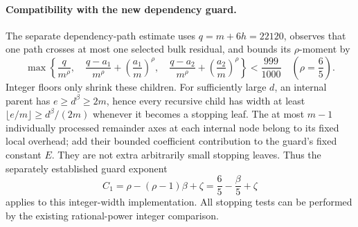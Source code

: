 \paragraph{Compatibility with the new dependency guard.}
The separate dependency-path estimate uses $q=m+6h=22120$, observes that
one path crosses at most one selected bulk residual, and bounds its
$\rho$-moment by
\[
 \max\left\{
 \frac q{m^\rho},\quad
 \frac{q-a_1}{m^\rho}+\left(\frac{a_1}{m}\right)^\rho,\quad
 \frac{q-a_2}{m^\rho}+\left(\frac{a_2}{m}\right)^\rho
 \right\}<\frac{999}{1000}
 \quad\left(\rho=\frac65\right).
\]
Integer floors only shrink these children.  For sufficiently large $d$,
an internal parent has $e\ge d^\beta\ge2m$, hence every recursive child
has width at least $\lfloor e/m\rfloor\ge d^\beta/(2m)$ whenever it
becomes a stopping leaf.  The at most $m-1$ individually processed
remainder axes at each internal node belong to its fixed local overhead;
add their bounded coefficient contribution to the guard's fixed constant
$E$.  They are not extra arbitrarily small stopping leaves.  Thus the
separately established guard exponent
\[
 C_1=\rho-(\rho-1)\beta+\zeta
     =\frac65-\frac\beta5+\zeta
\]
applies to this integer-width implementation.  All stopping tests can be
performed by the existing rational-power integer comparison.
